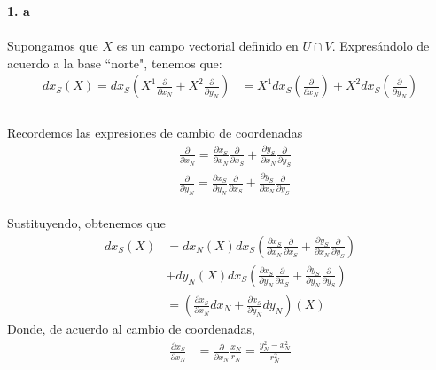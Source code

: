 \documentclass[11pt]{article}
\theoremstyle{definition}
\begin{document}
\textbf{1. a}\\ \\
Supongamos que $X$ es un campo vectorial definido en $U\cap V$. Expresándolo de acuerdo a la base ``norte", tenemos que:
\begin{equation*}
    \begin{split}
        dx_S(X)=dx_S\left(X^1\frac{\partial}{\partial x_N}+X^2\frac{\partial}{\partial y_N}\right)&= X^1dx_S\left(\frac{\partial}{\partial x_N}\right)
        + X^2dx_S\left(\frac{\partial}{\partial y_N}\right)\\
    \end{split}
\end{equation*}\\
Recordemos las expresiones de cambio de coordenadas\\
\begin{equation*}
    \begin{split}
            &\frac{\partial}{\partial x_N}=\frac{\partial x_S}{\partial x_N}\frac{\partial}{\partial x_S}+\frac{\partial y_S}{\partial x_N}\frac{\partial}{\partial y_S}\\
    &\frac{\partial}{\partial y_N}=\frac{\partial x_S}{\partial y_N}\frac{\partial}{\partial x_S}+\frac{\partial y_S}{\partial x_N}\frac{\partial}{\partial y_S}
    \end{split}
\end{equation*}\\
Sustituyendo, obtenemos que
\begin{equation*}
    \begin{split}
        dx_S(X)&=dx_N(X)dx_S\left(\frac{\partial x_S}{\partial x_N}\frac{\partial}{\partial x_S}+\frac{\partial y_S}{\partial x_N}\frac{\partial}{\partial y_S}\right)\\
        &+dy_N(X)dx_S\left(\frac{\partial x_S}{\partial y_N}\frac{\partial}{\partial x_S}+\frac{\partial y_S}{\partial y_N}\frac{\partial}{\partial y_S}\right)\\
        &=\left(\frac{\partial x_S}{\partial x_N}dx_N+\frac{\partial x_S}{\partial y_N}dy_N\right)(X)
    \end{split}
\end{equation*}
Donde, de acuerdo al cambio de coordenadas,
\begin{equation*}
    \begin{split}
        \frac{\partial x_S}{\partial x_N}&=\frac{\partial}{\partial x_N}\frac{x_N}{r_N}=\frac{y_N^2-x_N^2}{r_N^2}
    \end{split}
\end{equation*}
\end{document}
